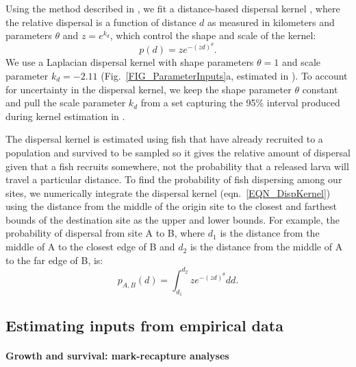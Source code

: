 \documentclass[12pt, oneside]{article}   	%
\begin{document}
Using the method described in \citep{bode2018estimating}, we fit a distance-based dispersal kernel \citep{catalanoInPrepconnectivity}, where the relative dispersal is a function of distance $d$ as measured in kilometers and parameters $\theta$ and $z = e^{k_d}$, which control the shape and scale of the kernel:
\begin{equation}
p(d) = ze^{-(zd)^\theta}. \label{EQN_DispKernel}
\end{equation}
We use a Laplacian dispersal kernel with shape parameters $\theta = 1$ and scale parameter $k_d = -2.11$ (Fig.\ \ref{FIG_ParameterInputs}a, estimated in \citep{catalanoInPrepconnectivity}). To account for uncertainty in the dispersal kernel, we keep the shape parameter $\theta$ constant and pull the scale parameter $k_d$ from a set capturing the 95\% interval produced during kernel estimation in \cite{catalanoInPrepconnectivity}.

The dispersal kernel is estimated using fish that have already recruited to a population and survived to be sampled so it gives the relative amount of dispersal given that a fish recruits somewhere, not the probability that a released larva will travel a particular distance. To find the probability of fish dispersing among our sites, we numerically integrate the dispersal kernel (eqn.\ \ref{EQN_DispKernel}) using the distance from the middle of the origin site to the closest and farthest bounds of the destination site as the upper and lower bounds. For example, the probability of dispersal from site A to B, where $d_1$ is the distance from the middle of A to the closest edge of B and $d_2$ is the distance from the middle of A to the far edge of B, is:
\begin{equation} %
p_{A, B}(d) = \int_{d_1}^{d_2} z e^{-(zd)^\theta}  dd. \label{EQN_integratingDK}
\end{equation}

\subsection*{Estimating inputs from empirical data} 

\paragraph*{Growth and survival: mark-recapture analyses}
\end{document}
